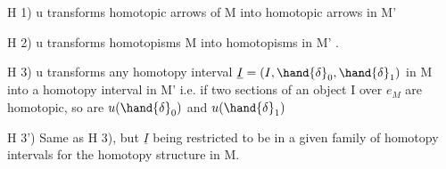 H 1)  u transforms homotopic arrows of M into homotopic arrows in M'

H 2)  u transforms homotopisms  M into homotopisms in M' .

H 3)  u transforms any homotopy interval $\underline{I} = (I,\hand{\delta}_0,\hand{\delta}_1)$ in M into a
homotopy interval in M' \hand{(} i.e. if two sections of an object
I over $e_M$ are homotopic, so are $u(\hand{\delta}_0)$ and $u(\hand{\delta}_1)$

H 3')  Same as H 3), but $\underline{I}$ being restricted to be in a given %
 family of homotopy intervals\hand{,}  for the homotopy 
structure in M.

